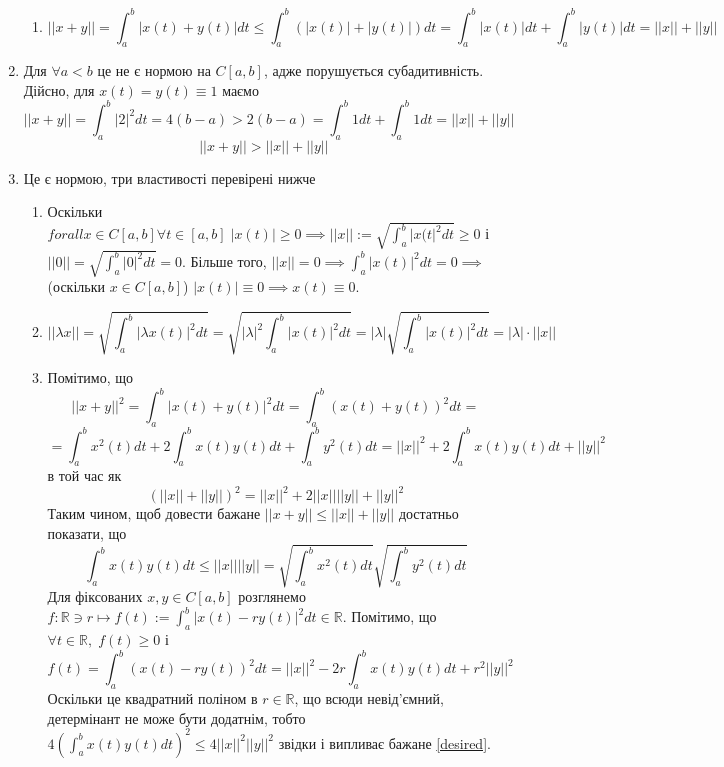 \documentclass[12pt]{article} %
\newcommand{\mynorm}[1]{\left|\left|#1\right|\right|}
\newcommand{\myabs}[1]{\left|#1\right|}
\begin{document}
\begin{enumerate}
{\begin{enumerate}[label=(\arabic*)]
				\item{
					\newcommand{\mymax}[1]{\int_a^b #1 dt}
					\[\mynorm{x+y}=\mymax{\myabs{x(t)+y(t)}}
					\leq\mymax{\left(\myabs{x(t)}+\myabs{y(t)}\right)}=
					\mymax{\myabs{x(t)}}+\mymax{\myabs{y(t)}}=\mynorm{x}+\mynorm{y}\]
					}
			\end{enumerate}
		}
	\item{Для $\forall a<b$ це не є нормою на $C[a,b]$, адже порушується субадитивність. Дійсно, для $x(t)=y(t)\equiv 1$ маємо
		\[\mynorm{x+y}=\int_a^b \myabs{2}^2dt=4(b-a)>2(b-a)=\int_a^b 1dt+\int_a^b 1dt=\mynorm{x}+\mynorm{y}\]
		\[\mynorm{x+y}>\mynorm{x}+\mynorm{y}\]
		}
	\item{Це є нормою, три властивості перевірені нижче
			\begin{enumerate}[label=(\arabic*)]
				\item{Оскільки $forall x\in C[a,b]\forall t\in[a,b]\;\myabs{x(t)}\geq0\implies
					\mynorm{x}:=\sqrt{\int_a^b\myabs{x(t}^2dt}\geq 0$ і $\mynorm{0}=\sqrt{\int_a^b\myabs{0}^2dt}=0$.
					Більше того, 
					$\mynorm{x}=0\implies\int_a^b\myabs{x(t)}^2dt=0\implies $ (оскільки $x\in C[a,b]$) 
					$\myabs{x(t)}\equiv 0\implies
					x(t)\equiv 0$.
					}
				\item{
					\newcommand{\mymax}[1]{\sqrt{\int_a^b {#1}^2 dt}}
					\[\mynorm{\lambda x}=\mymax{\myabs{\lambda x(t)}}=
					\sqrt{\myabs{\lambda}^2\int_a^b {\myabs{x(t)}^2 dt}}=
					\myabs{\lambda}\mymax{ \myabs{x(t)}}=
					\myabs{\lambda}\cdot\mynorm{x}\]}
				\item{
					\newcommand{\mymax}[1]{\sqrt{\int_a^b {#1} dt}}
					\newcommand{\mymaxwo}[1]{{\int_a^b {#1}^2 dt}}
					Помітимо, що
					\[\mynorm{x+y}^2=
					\mymaxwo{\myabs{x(t)+y(t)}}=
					\mymaxwo{(x(t)+y(t))}=\]\[
					=\int_a^b x^2(t)dt+2\int_a^b x(t)y(t)dt+\int_a^by^2(t)dt=
					\mynorm{x}^2+2\int_a^bx(t)y(t)dt+\mynorm{y}^2
					\]
					в той час як
					\[(\mynorm{x}+\mynorm{y})^2=
					\mynorm{x}^2+2\mynorm{x}\mynorm{y}+\mynorm{y}^2\]
					Таким чином, щоб довести бажане $\mynorm{x+y}\leq\mynorm{x}+\mynorm{y}$
					достатньо показати, що
					\[\int_a^bx(t)y(t)dt\leq\mynorm{x}\mynorm{y}=\mymax{x^2(t)}\mymax{y^2(t)}\tag{*}\label{desired}\]
					Для фіксованих $x,y\in C[a,b]$ розглянемо $f:\mathbb{R}\ni r\mapsto f(t):=\int_a^b \myabs{x(t)-r
					y(t)}^2dt\in\mathbb{R}$. Помітимо, що $\forall t\in\mathbb{R},\;f(t)\geq0$ і 
					\[f(t)=\int_a^b (x(t)-ry(t))^2dt=\mynorm{x}^2-2r\int_a^b x(t)y(t)dt+r^2\mynorm{y}^2\]
					Оскільки це квадратний поліном в $r\in\mathbb{R}$, що всюди невід’ємний, детермінант не може
					бути додатнім, тобто
					$4\left(\int_a^b x(t)y(t)dt\right)^2\leq 4\mynorm{x}^2\mynorm{y}^2$
					звідки і випливає бажане \ref{desired}.
					}
			\end{enumerate}
		}
	\end{enumerate}
\end{document}
